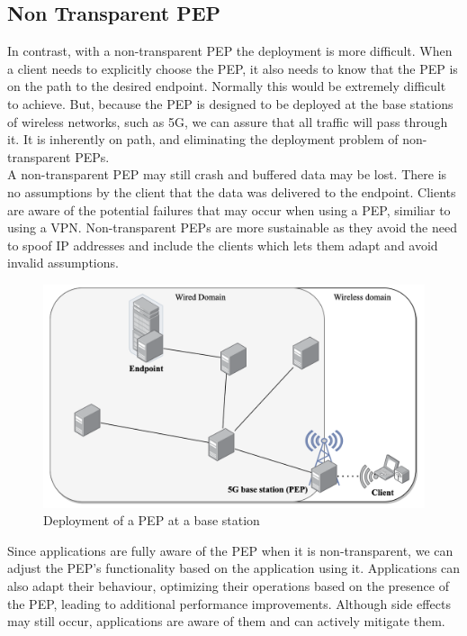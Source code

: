 \documentclass[a4paper,english, 12pt]{report}
\begin{document}
\subsection{Non Transparent PEP}
In contrast, with a non-transparent PEP the deployment is more difficult. When a client needs to explicitly choose the PEP, it also needs to know that the PEP is on the path to the desired endpoint. Normally this would be extremely difficult to achieve. But, because the PEP is designed to be deployed at the base stations of wireless networks, such as 5G, we can assure that all traffic will pass through it. It is inherently on path, and eliminating the deployment problem of non-transparent PEPs.\\

A non-transparent PEP may still crash and buffered data may be lost. There is no assumptions by the client that the data was delivered to the endpoint. Clients are aware of the potential failures that may occur when using a PEP, similiar to using a VPN. Non-transparent PEPs are more sustainable as they avoid the need to spoof IP addresses and include the clients which lets them adapt and avoid invalid assumptions.\\


\begin{figure} %
	\centering
	\includegraphics[scale=0.55]{../diagrams/drawio/deployment.png}
  	\caption{Deployment of a PEP at a base station}
  	\label{fig:pep_deployment}
\end{figure}


Since applications are fully aware of the PEP when it is non-transparent, we can adjust the PEP's functionality based on the application using it. Applications can also adapt their behaviour, optimizing their operations based on the presence of the PEP, leading to additional performance improvements. Although side effects may still occur, applications are aware of them and can actively mitigate them.\\
\end{document}
